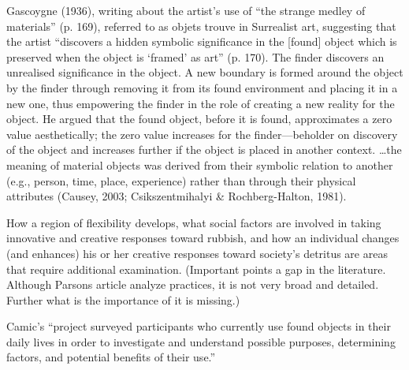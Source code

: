 \documentclass[12pt]{article}
\providecommand{\quotes}[1]{``#1''}
\begin{document}
Gascoygne (1936), writing about the artist’s use of “the strange medley of materials” (p. 169), referred to as objets trouve in Surrealist art, suggesting that the artist “discovers a hidden symbolic significance in the [found] object which is preserved when the object is ‘framed’ as art” (p. 170). The finder discovers an unrealised significance in the object. A new boundary is formed around the object by the finder through removing it from its found environment and placing it in a new one, thus empowering the finder in the role of creating a new reality for the object. He argued that the found object, before it is found, approximates a zero value aesthetically; the zero value increases for the finder---beholder on discovery of the object and increases further if the object is placed in another context. \ldots the meaning of material objects was derived from their symbolic relation to another (e.g., person, time, place, experience) rather than through their physical attributes (Causey, 2003; Csikszentmihalyi \& Rochberg-Halton, 1981). 

How a region of flexibility develops, what social factors are involved in taking innovative and creative responses toward rubbish, and how an individual changes (and enhances) his or her creative responses toward society’s detritus are areas that require additional examination. (Important points a gap in the literature. Although Parsons article analyze practices, it is not very broad and detailed. Further what is the importance of it is missing.)

Camic's \quotes{project surveyed participants who currently use found objects in their daily lives in order to investigate and understand possible purposes, determining factors, and potential benefits of their use.} 
\end{document}
